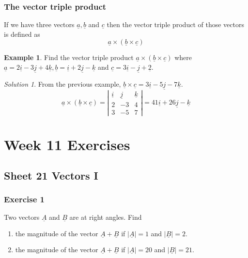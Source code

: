 \documentclass[
  11pt,
  oneside]{book}
\providecommand{\tightlist}{%
  \setlength{\itemsep}{0pt}\setlength{\parskip}{0pt}}
\newcommand{\slide}{}
\theoremstyle{definition}
\theoremstyle{definition}
\newtheorem{example}{Example}[chapter]
\theoremstyle{definition}
\theoremstyle{definition}
\theoremstyle{remark}
\newtheorem*{solution}{Solution}
\begin{document}
\slide

\subsection{The vector triple product}\label{the-vector-triple-product}

If we have three vectors \(\underline a, \underline b\) and \(\underline c\) then the vector triple product of those vectors is defined as
\[
\underline a \times (\underline b \times\underline c)
\]

\begin{example}
Find the vector triple product \(\underline a \times (\underline b \times\underline c)\) where \(\underline a = 2\underline i - 3\underline j + 4\underline k, \underline b = \underline i + 2\underline j - \underline k\) and \(\underline c = 3\underline i - \underline j + \underline 2\).
\end{example}

\begin{solution}
From the previous example, \(\underline b \times\underline c = 3\underline i-5\underline j-7\underline k\).
\[
\underline a \times (\underline b \times\underline c) = \left|\begin{array}{ccc}\underline i&\underline j&\underline k\\2&-3&4\\3&-5&7\end{array}\right| = 41\underline i+26\underline j-\underline k
\]
\end{solution}

\chapter*{Week 11 Exercises}\label{week-11-exercises}

\section{Sheet 21 Vectors I}\label{sheet-21-vectors-i}

\subsection*{Exercise 1}\label{exercise-1-12}

Two vectors \(\underline A\) and \(\underline B\) are at right angles. Find

\begin{enumerate}
\def\labelenumi{\arabic{enumi}.}
\tightlist
\item
  the magnitude of the vector \(\underline A+\underline B\) if \(|\underline A| = 1\) and \(|\underline B| = 2\).
\item
  the magnitude of the vector \(\underline A+\underline B\) if \(|\underline A|=20\) and \(|\underline B| = 21\).
\end{enumerate}
\end{document}
